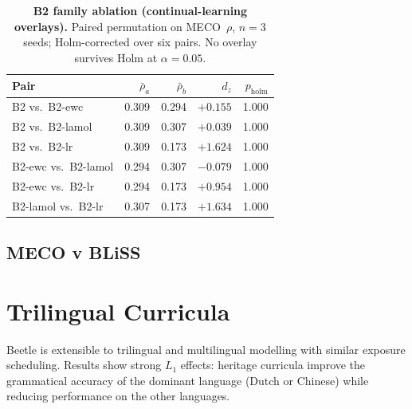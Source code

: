 \begin{table}[!ht]
  \centering \small
  \caption{\textbf{B2 family ablation (continual-learning overlays).} Paired
  permutation on MECO~$\rho$, $n{=}3$ seeds; Holm-corrected over six pairs. No
  overlay survives Holm at $\alpha{=}0.05$.}
  \label{tab:sig_B3}
  \begin{tabular}{lrrrr}
    \toprule
    Pair & $\bar\rho_a$ & $\bar\rho_b$ & $d_z$ & $p_{\mathrm{holm}}$ \\
    \midrule
    B2 vs.\ B2-ewc       & 0.309 & 0.294 & $+0.155$ & 1.000 \\
    B2 vs.\ B2-lamol     & 0.309 & 0.307 & $+0.039$ & 1.000 \\
    B2 vs.\ B2-lr        & 0.309 & 0.173 & $+1.624$ & 1.000 \\
    B2-ewc vs.\ B2-lamol & 0.294 & 0.307 & $-0.079$ & 1.000 \\
    B2-ewc vs.\ B2-lr    & 0.294 & 0.173 & $+0.954$ & 1.000 \\
    B2-lamol vs.\ B2-lr  & 0.307 & 0.173 & $+1.634$ & 1.000 \\
    \bottomrule
  \end{tabular}
\end{table}

\subsection{MECO v BLiSS}


\section{Trilingual Curricula}

Beetle is extensible to trilingual and multilingual modelling with similar exposure scheduling. Results show strong $L_1$ effects: heritage curricula improve the grammatical accuracy of the dominant language (Dutch or Chinese) while reducing performance on the other languages. 

